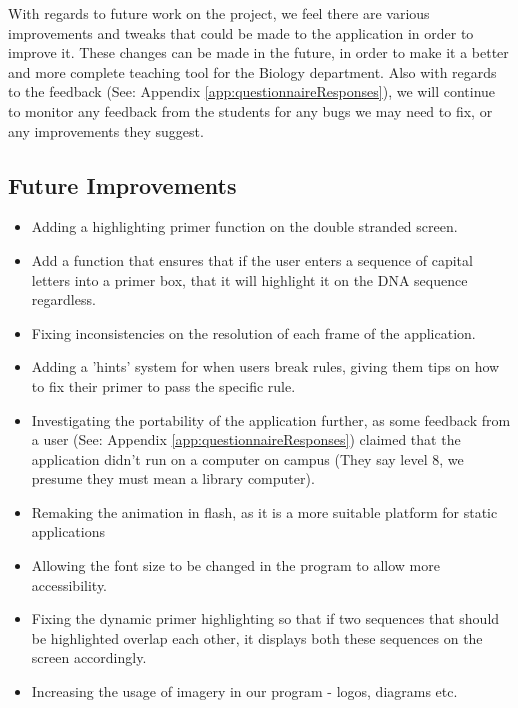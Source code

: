 
With regards to future work on the project, we feel there are various improvements and tweaks that could be made to the application in order to improve it. These changes can be made in the future, in order to make it a better and more complete teaching tool for the Biology department. Also with regards to the feedback (See: Appendix \ref{app:questionnaireResponses}), we will continue to monitor any feedback from the students for any bugs we may need to fix, or any improvements they suggest.

\subsection{Future Improvements}

\begin{itemize}

\item Adding a highlighting primer function on the double stranded screen.

\item Add a function that ensures that if the user enters a sequence of capital letters into a primer box, that it will highlight it on the DNA sequence regardless.

\item Fixing inconsistencies on the resolution of each frame of the application.

\item Adding a 'hints' system for when users break rules, giving them tips on how to fix their primer to pass the specific rule.

\item Investigating the portability of the application further, as some feedback from a user (See: Appendix \ref{app:questionnaireResponses}) claimed that the application didn't run on a computer on campus (They say level 8, we presume they must mean a library computer).

\item Remaking the animation in flash, as it is a more suitable platform for static applications

\item Allowing the font size to be changed in the program to allow more accessibility.

\item Fixing the dynamic primer highlighting so that if two sequences that should be highlighted overlap each other, it displays both these sequences on the screen accordingly.

\item Increasing the usage of imagery in our program - logos, diagrams etc.

 

\end{itemize}











